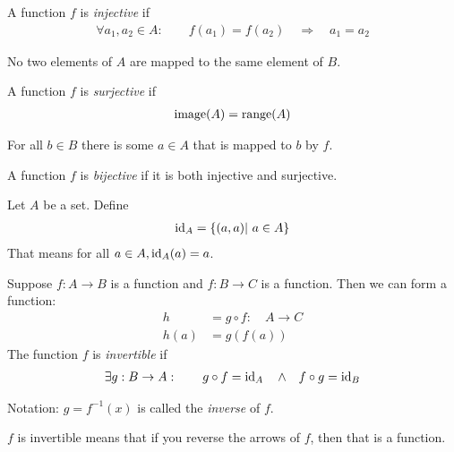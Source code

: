 \begin{df}
	A function $f$ is \emph{injective} if 
	\begin{align*}
	\forall a_1, a_2 \in A: \qquad f(a_1) = f(a_2) \quad \Rightarrow \quad a_1 = a_2 
	\end{align*}
\end{df}
No two elements of $A$ are mapped to the same element of $B$.

\begin{df}
	A function $f$ is \emph{surjective} if 
	\begin{align*}
	\operatorname{image}(A) = \operatorname{range}(A)
	\end{align*}
\end{df}
For all $b \in B$ there is some $a \in A$ that is mapped to $b$ by $f$.

\begin{df}
	A function $f$ is \emph{bijective} if it is both injective and surjective.
\end{df}

\begin{df}
	Let $A$ be a set. Define 
	\begin{align*}
		\operatorname{id}_A = \{(a,a)| ~ a \in A\}
	\end{align*} That means for all $a \in A, \operatorname{id}_A(a) = a$.
\end{df}

\begin{df}
	Suppose $f: A \to B$ is a function and $f: B \to C$ is a function. Then we can form a function:
	\begin{align*}
	h & = g \circ f: \quad A \to C \\
	h(a) & = g(f(a))
	\end{align*}
	The function $f$ is \emph{invertible} if
	\begin{align*}
	\exists g: B \to A: \qquad g \circ f = \operatorname{id}_A \quad \wedge \quad f \circ g = \operatorname{id}_B	
	\end{align*}
	
	Notation:
	$g = f^{-1}(x)$ is called the \emph{inverse} of $f$.
\end{df}
$f$ is invertible means that if you reverse the arrows of $f$, then that is a function.

